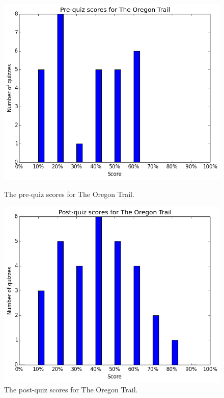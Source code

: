 			\begin{figure}[h] 
			\centering 
			\begin{minipage}[b]{0.45\linewidth}
			\includegraphics[width=\textwidth]{oregon_pre.png} 
			\caption{The pre-quiz scores for The Oregon Trail.}
			\end{minipage}
			\quad
			\begin{minipage}[b]{0.45\linewidth}
			\includegraphics[width=\textwidth]{oregon_post.png} 
			\caption{The post-quiz scores for The Oregon Trail.}
			\end{minipage}
			\end{figure}
			
